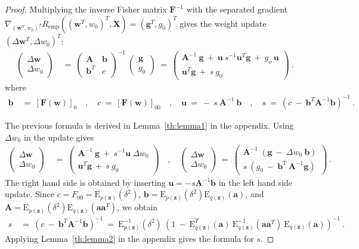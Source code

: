 \documentclass{article}
\newcommand\Ba{\bm{a}}
\newcommand\Bb{\bm{b}}
\newcommand\Bg{\bm{g}}
\newcommand\Bu{\bm{u}}
\newcommand\Bw{\bm{w}}
\newcommand\Bz{\bm{z}}
\newcommand\BA{\bm{A}}
\newcommand\BF{\bm{F}}
\newcommand\BX{\bm{X}}
\newcommand\EXP{\mathbf{\mathrm{E}}}
\begin{document}
\begin{proof}
Multiplying the inverse Fisher matrix $\BF^{-1}$ with the separated
gradient $\nabla_{(\Bw^T,w_0)^T}  R_{\mathrm{emp}}((\Bw^T,w_0)^T,\BX) =(\Bg^T , g_0)^T$
gives the weight update $(\Delta \Bw^T , \Delta w_0)^T$:
\begin{align}
\begin{pmatrix}
\Delta \Bw \\
\Delta w_0
\end{pmatrix}
\ &= \
\begin{pmatrix}
\BA & \Bb \\
\Bb^T & c
\end{pmatrix}^{-1} \
\begin{pmatrix}
\Bg \\
g_0
\end{pmatrix}
\ = \
\begin{pmatrix}
\BA^{-1} \ \Bg \ + \ \Bu \ s^{-1} \Bu^T \Bg \ + \ g_o \ \Bu \\
 \Bu^T \Bg \ + \ s \ g_0
\end{pmatrix} \ .
\end{align}
where
\begin{align}
\Bb \ &= \ \left[\BF(\Bw)\right]_{0} \quad , \quad
c  \ = \ \left[\BF(\Bw)\right]_{00} \quad , \quad \Bu \ = \ - \  s \
\BA^{-1} \ \Bb \quad , \quad s \ = \ \left( c \ - \ \Bb^T\BA^{-1} \Bb \right)^{-1} \ .
\end{align}

The previous formula is derived in
Lemma~\ref{th:lemma1} in the appendix.
Using $\Delta w_0$ in the update gives
\begin{align}
\label{eq:updateW0}
\begin{pmatrix}
\Delta \Bw \\
\Delta w_0
\end{pmatrix}
\ &= \
\begin{pmatrix}
\BA^{-1} \ \Bg \ + \ s^{-1} \Bu \ \Delta w_0 \\
 \Bu^T \Bg \ + \ s \ g_0
\end{pmatrix} \quad , \quad
\begin{pmatrix}
\Delta \Bw \\
\Delta w_0
\end{pmatrix}
\ = \
\begin{pmatrix}
\BA^{-1} \ \left( \Bg \ - \ \Delta w_0 \ \Bb \right) \\
s \ \left( g_0 \ - \ \Bb^T \ \BA^{-1} \Bg \right)
\end{pmatrix} \ .
\end{align}
The right hand side is obtained by inserting
$\Bu=  - s \BA^{-1} \Bb$ in the left hand side
update.
Since $c=F_{00}=\EXP_{p(\Bz)} ( \delta^2 )$,
$\Bb= \EXP_{p(\Bz)} ( \delta^2 )  \EXP_{q(\Bz)} (\Ba)$,
and $\BA= \EXP_{p(\Bz)} ( \delta^2 )  \EXP_{q(\Bz)}(\Ba \Ba^T)$, we obtain
\begin{align}
s \ &= \ \left( c \ - \ \Bb^T\BA^{-1} \Bb \right)^{-1}
\ = \ \EXP_{p(\Bz)}^{-1} ( \delta^2 ) \
\left( 1 \ - \ \EXP_{q(\Bz)}^T(\Ba)  \
\EXP_{q(\Bz)}^{-1} (\Ba \Ba^T) \ \EXP_{q(\Bz)} (\Ba) \right)^{-1}  \ .
\end{align}
Applying Lemma~\ref{th:lemma2} in the appendix gives the formula for $s$.
\end{proof}
\end{document}
